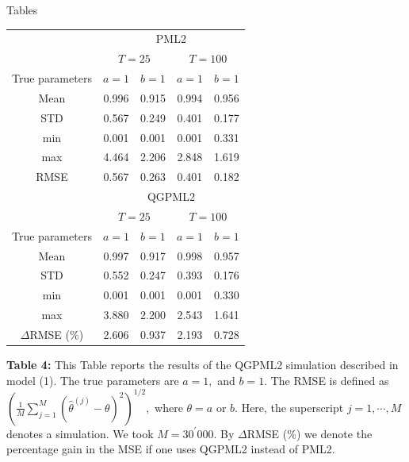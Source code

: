 \documentclass[a4paper, 12pt, oneside]{Thesis}
\begin{document}
\label{Bibliography}


\clearpage\newpage
\begin{center}
{\Huge Tables}
\end{center}

\begin{center}
{
\begin{tabular}{c|cc|cc}
& \multicolumn{4}{c}{PML2} \\
& \multicolumn{2}{c}{$T=25$} & \multicolumn{2}{c}{$T=100$} \\
True parameters & $a=1$ & $b=1$ & $a=1$ & $b=1$ \\
Mean & 0.996 & 0.915 & 0.994 & 0.956 \\
STD & 0.567 & 0.249 & 0.401 & 0.177 \\
min & 0.001 & 0.001 & 0.001 & 0.331 \\
max & 4.464 & 2.206 & 2.848 & 1.619 \\
RMSE & 0.567 & 0.263 & 0.401 & 0.182 \\[+2ex]
& \multicolumn{4}{c}{QGPML2} \\
& \multicolumn{2}{c}{$T=25$} & \multicolumn{2}{c}{$T=100$} \\
True parameters & $a=1$ & $b=1$ & $a=1$ & $b=1$ \\
Mean & 0.997 & 0.917 & 0.998 & 0.957 \\
STD & 0.552 & 0.247 & 0.393 & 0.176 \\
min & 0.001 & 0.001 & 0.001 & 0.330 \\
max & 3.880 & 2.200 & 2.543 & 1.641 \\
$\Delta$RMSE ($\%$) & 2.606 & 0.937 & 2.193 & 0.728%
\end{tabular}
}
\end{center}

{ \vspace*{0.2cm}\textbf{Table 4:} This Table reports the results
of the QGPML2 simulation described in model (1). The true
parameters are $a=1,$ and $b=1.$ The RMSE is defined
as $\left(\frac{1}{M}\sum_{j=1}^M(\hat\theta^{(j)}-\theta)^2\right)^{1/2},$
where $\theta=a$ or $b.$ Here, the superscript $j=1,\cdots,M$ denotes a
simulation. We took $M=30^{\prime}000.$ By $\Delta$RMSE ($\%$) we denote the
percentage gain in the MSE if one uses QGPML2 instead of PML2. }
\end{document}
